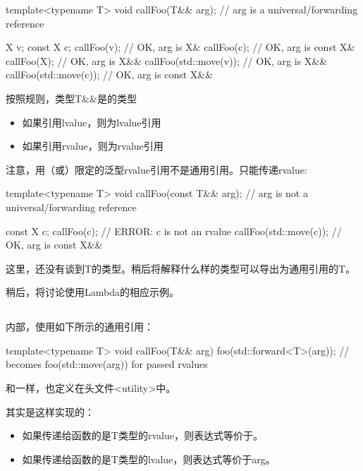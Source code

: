 \begin{cppcode}
template<typename T>
void callFoo(T&& arg); // arg is a universal/forwarding reference

X v;
const X c;
callFoo(v); // OK, arg is X&
callFoo(c); // OK, arg is const X&
callFoo(X{}); // OK, arg is X&&
callFoo(std::move(v)); // OK, arg is X&&
callFoo(std::move(c)); // OK, arg is const X&&
\end{cppcode}

按照规则，类型T\&\&是的类型

\begin{itemize}
	\item 如果引用lvalue，则为lvalue引用
	\item 如果引用rvalue，则为rvalue引用
\end{itemize}

注意，用（或）限定的泛型rvalue引用不是通用引用。只能传递rvalue:

\begin{cppcode}
template<typename T>
void callFoo(const T&& arg); // arg is not a universal/forwarding reference

const X c;
callFoo(c); // ERROR: c is not an rvalue
callFoo(std::move(c)); // OK, arg is const X&&
\end{cppcode}

这里，还没有谈到T的类型。稍后将解释什么样的类型可以导出为通用引用的T。

稍后，将讨论使用Lambda的相应示例。

\subsection{}

内部，使用如下所示的通用引用：

\begin{cppcode}
template<typename T>
void callFoo(T&& arg) {
	foo(std::forward<T>(arg)); // becomes foo(std::move(arg)) for passed rvalues
}
\end{cppcode}

和一样，也定义在头文件<utility>中。

其实是这样实现的：

\begin{itemize}
	\item 如果传递给函数的是T类型的rvalue，则表达式等价于。
	\item 如果传递给函数的是T类型的lvalue，则表达式等价于arg。
\end{itemize}

